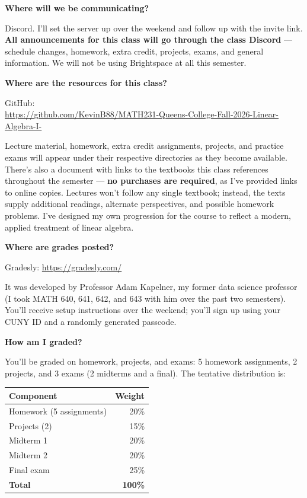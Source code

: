 \documentclass[11pt]{article}
\newcommand{\faq}[1]{\vspace{0.6em}\textbf{\color{accent}#1}\par\nobreak\vspace{0.15em}}
\begin{document}
\faq{Where will we be communicating?}
Discord. I'll set the server up over the weekend and follow up with the invite link. \textbf{All announcements for this class will go through the class Discord} --- schedule changes, homework, extra credit, projects, exams, and general information. We will not be using Brightspace at all this semester.

\faq{Where are the resources for this class?}
GitHub:\\
\url{https://github.com/KevinB88/MATH231-Queens-College-Fall-2026-Linear-Algebra-I-}

Lecture material, homework, extra credit assignments, projects, and practice exams will appear under their respective directories as they become available. There's also a document with links to the textbooks this class references throughout the semester --- \textbf{no purchases are required}, as I've provided links to online copies. Lectures won't follow any single textbook; instead, the texts supply additional readings, alternate perspectives, and possible homework problems. I've designed my own progression for the course to reflect a modern, applied treatment of linear algebra.

\faq{Where are grades posted?}
Gradesly: \url{https://gradesly.com/}

It was developed by Professor Adam Kapelner, my former data science professor (I took MATH 640, 641, 642, and 643 with him over the past two semesters). You'll receive setup instructions over the weekend; you'll sign up using your CUNY ID and a randomly generated passcode.

\faq{How am I graded?}
You'll be graded on homework, projects, and exams: 5 homework assignments, 2 projects, and 3 exams (2 midterms and a final). The tentative distribution is:

\begin{center}
\begin{tabular}{@{}l r@{}}
\toprule
\textbf{Component} & \textbf{Weight} \\
\midrule
Homework (5 assignments) & 20\% \\
Projects (2) & 15\% \\
Midterm 1 & 20\% \\
Midterm 2 & 20\% \\
Final exam & 25\% \\
\midrule
\textbf{Total} & \textbf{100\%} \\
\bottomrule
\end{tabular}
\end{center}
\end{document}

